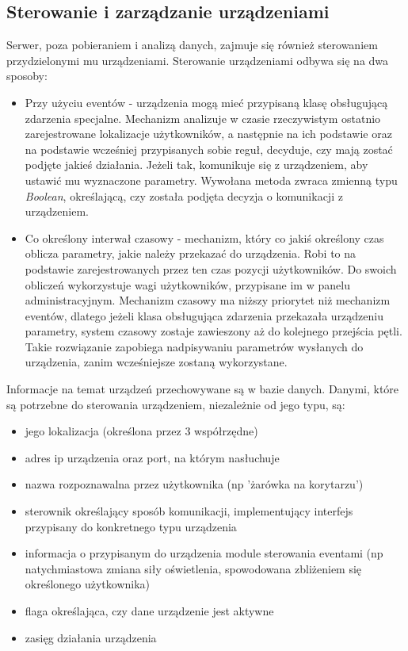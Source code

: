 \subsection{Sterowanie i zarządzanie urządzeniami}
Serwer, poza pobieraniem i analizą danych, zajmuje się również sterowaniem przydzielonymi mu urządzeniami. Sterowanie urządzeniami odbywa się na dwa sposoby:
\begin{itemize}
	\item Przy użyciu eventów - urządzenia mogą mieć przypisaną klasę obsługującą zdarzenia specjalne. Mechanizm analizuje w czasie rzeczywistym ostatnio zarejestrowane lokalizacje użytkowników, a następnie na ich podstawie oraz na podstawie wcześniej przypisanych sobie reguł, decyduje, czy mają zostać podjęte jakieś działania. Jeżeli tak, komunikuje się z urządzeniem, aby ustawić mu wyznaczone parametry. Wywołana metoda zwraca zmienną typu \textit{Boolean}, określającą, czy została podjęta decyzja o komunikacji z urządzeniem.
	\item Co określony interwał czasowy - mechanizm, który co jakiś określony czas oblicza parametry, jakie należy przekazać do urządzenia. Robi to na podstawie zarejestrowanych przez ten czas pozycji użytkowników. Do swoich obliczeń wykorzystuje wagi użytkowników, przypisane im w panelu administracyjnym. Mechanizm czasowy ma niższy priorytet niż mechanizm eventów, dlatego jeżeli klasa obsługująca zdarzenia przekazała urządzeniu parametry, system czasowy zostaje zawieszony aż do kolejnego przejścia pętli. Takie rozwiązanie zapobiega nadpisywaniu parametrów wysłanych do urządzenia, zanim wcześniejsze zostaną wykorzystane.
\end{itemize}
Informacje na temat urządzeń przechowywane są w bazie danych. Danymi, które są potrzebne do sterowania urządzeniem, niezależnie od jego typu, są:
\begin{itemize}
	\item jego lokalizacja (określona przez 3 współrzędne)
	\item adres ip urządzenia oraz port, na którym nasłuchuje
	\item nazwa rozpoznawalna przez użytkownika (np 'żarówka na korytarzu')
	\item sterownik określający sposób komunikacji, implementujący interfejs przypisany do konkretnego typu urządzenia
	\item informacja o przypisanym do urządzenia module sterowania eventami (np natychmiastowa zmiana siły oświetlenia, spowodowana zbliżeniem się określonego użytkownika)
	\item flaga określająca, czy dane urządzenie jest aktywne
	\item zasięg działania urządzenia
\end{itemize}
